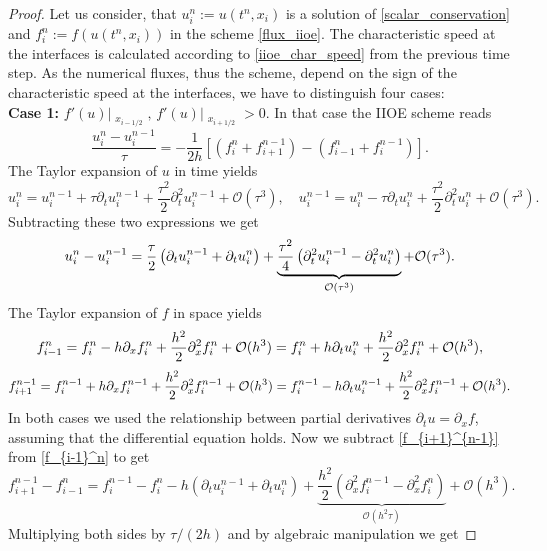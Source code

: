 \documentclass[../include.tex]{subfiles}
\begin{document}
\begin{proof}
	 Let us consider, that $ u^n_i := u(t^n, x_i) $ is a solution of \eqref{scalar_conservation} and $ f^n_i := f(u(t^n, x_i)) $ in the scheme \eqref{flux_iioe}. The characteristic speed at the interfaces is calculated according to \eqref{iioe_char_speed} from the previous time step. As the numerical fluxes, thus the scheme, depend on the sign of the characteristic speed at the interfaces, we have to distinguish four cases:\\
\textbf{Case 1: }$ f'(u)\big|_{\substack{x_{i-1/2}}},\,f'(u)\big|_{\substack{x_{i+1/2}}} > 0 $. In that case the IIOE scheme reads
\[
\frac{u_i^{n} - u_i^{n - 1}}{\tau} = - \frac{1}{2h}\left[(f_i^n + f_{i+1}^{n-1}) - (f_{i-1}^n + f_i^{n-1})\right].
\]
The Taylor expansion of $ u $ in time yields
\[
u_i^n = u_i^{n-1} + \tau \partial_t u_i^{n-1} + \frac{\tau^2}{2}\partial_t^2 u_i^{n-1} + \mathcal{O}(\tau^3),\quad
u_i^{n-1} = u_i^{n} - \tau \partial_t u_i^n + \frac{\tau^2}{2}\partial_t^2 u_i^n + \mathcal{O}(\tau^3).
\]
Subtracting these two expressions we get
\begin{equation}
	u_i^n - u_i^{n-1} = \frac{\tau}{2}\left(\partial_t u_i^{n-1} + \partial_t u_i^n\right) + 
	\underbrace{\frac{\tau^2}{4}\left(\partial_t^2 u_i^{n-1} - \partial_t^2 u_i^n\right)}_{\mathcal{O}(\tau^3)}
	+ \mathcal{O}(\tau^3).
	\label{u_i^n - u_i^{n-1}}
\end{equation}
The Taylor expansion of $ f $ in space yields
\begin{equation}
	f_{i-1}^n = f_i^n - h\partial_x f_i^n + \frac{h^2}{2}\partial_x^2 f_i^n + \mathcal{O}(h^3) = f_i^n + h\partial_t u_i^n + \frac{h^2}{2}\partial_x^2 f_i^n + \mathcal{O}(h^3),
	\label{f_{i-1}^n}
\end{equation}
\begin{equation}
	f_{i+1}^{n-1} = f_i^{n-1} + h \partial_x f_i^{n-1} + \frac{h^2}{2} \partial_x^2 f_i^{n-1} + \mathcal{O}(h^3) = 
	f_i^{n-1} - h \partial_t u_i^{n-1} + \frac{h^2}{2} \partial_x^2 f_i^{n-1} + \mathcal{O}(h^3).
	\label{f_{i+1}^{n-1}}
\end{equation}
In both cases we used the relationship between partial derivatives $ \partial_t u = \partial_x f $, assuming that the differential equation holds.
Now we subtract \eqref{f_{i+1}^{n-1}} from \eqref{f_{i-1}^n} to get
\[
f_{i+1}^{n-1} - f_{i-1}^n = f_i^{n-1} - f_i^n - h\left(\partial_t u_i^{n-1} + \partial_t u_i^{n}\right)
+ \underbrace{\frac{h^2}{2} \left(\partial_x^2 f_i^{n-1} - \partial_x^2 f_i^{n}\right)}_{\mathcal{O}(h^2\tau)} + \mathcal{O}(h^3).
\]
Multiplying both sides by $ \tau/(2h) $ and by algebraic manipulation we get

\end{proof}
\end{document}
